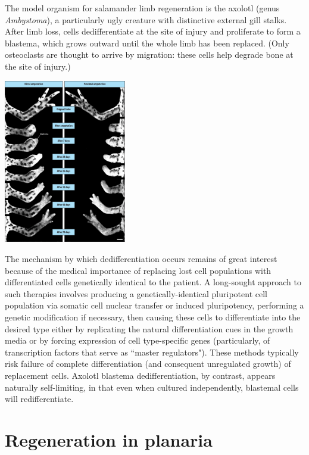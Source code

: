 \documentclass{article}
\begin{document}
The model organism for salamander limb regeneration is the axolotl (genus \textit{Ambystoma}), a particularly ugly  creature with distinctive external gill stalks. After limb loss, cells dedifferentiate at the site of injury and proliferate to form a blastema, which grows outward until the whole limb has been replaced. (Only osteoclasts are thought to arrive by migration: these cells help degrade bone at the site of injury.)

\begin{center}
\includegraphics[width=0.4\textwidth]{amphibian_limb.pdf}
\end{center}


The mechanism by which dedifferentiation occurs remains of great interest because of the medical importance of replacing lost cell populations with differentiated cells genetically identical to the patient. A long-sought approach to such therapies involves producing a genetically-identical pluripotent cell population via somatic cell nuclear transfer or induced pluripotency, performing a genetic modification if necessary, then causing these cells to differentiate into the desired type either by replicating the natural differentiation cues in the growth media or by forcing expression of cell type-specific genes (particularly, of transcription factors that serve as ``master regulators"). These methods typically risk failure of complete differentiation (and consequent unregulated growth) of replacement cells. Axolotl blastema dedifferentiation, by contrast, appears naturally self-limiting, in that even when cultured independently, blastemal cells will redifferentiate.

\section*{Regeneration in planaria}
\end{document}
